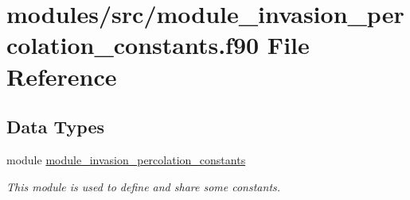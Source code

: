 \hypertarget{module__invasion__percolation__constants_8f90}{
\section{modules/src/module\-\_\-invasion\-\_\-percolation\-\_\-constants.f90 \-File \-Reference}
\label{module__invasion__percolation__constants_8f90}
}
\subsection*{\-Data \-Types}
\begin{DoxyCompactItemize}
\item 
module \hyperlink{classmodule__invasion__percolation__constants}{module\-\_\-invasion\-\_\-percolation\-\_\-constants}
\begin{DoxyCompactList}\small\item\em \-This module is used to define and share some constants. \end{DoxyCompactList}\end{DoxyCompactItemize}
